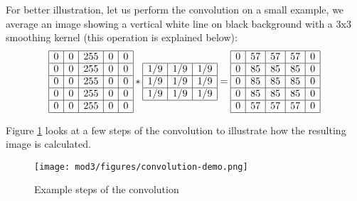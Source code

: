 For better illustration, let us perform the convolution on a small example, we average an image showing a vertical white line on black background with a 3x3 smoothing kernel (this operation is explained below):
\[
	\begin{array}{|c|c|c|c|c|}
	\hline
	0&0&255&0&0\\
\hline
0&0&255&0&0\\
\hline
0&0&255&0&0\\
\hline
0&0&255&0&0\\
\hline
0&0&255&0&0\\
\hline
	\end{array} 
	\ast 
	\begin{array}{|c|c|c|}
	\hline
	1/9&1/9&1/9\\
\hline
1/9&1/9&1/9\\
\hline
1/9&1/9&1/9\\
\hline
	\end{array}
	=
	\begin{array}{|c|c|c|c|c|}
	\hline
	0&57&57&57&0\\
\hline
0&85&85&85&0\\
\hline
0&85&85&85&0\\
\hline
0&85&85&85&0\\
\hline
0&57&57&57&0\\
\hline
	\end{array} 
\]

Figure \ref{fig:convolution-demo} looks at a few steps of the convolution to illustrate how the resulting image is calculated.

\newpage
\begin{figure}[!ht]
	\centering
		\texttt{[image: mod3/figures/convolution-demo.png]}
	\caption{Example steps of the convolution}
	\label{fig:convolution-demo}
\end{figure}

